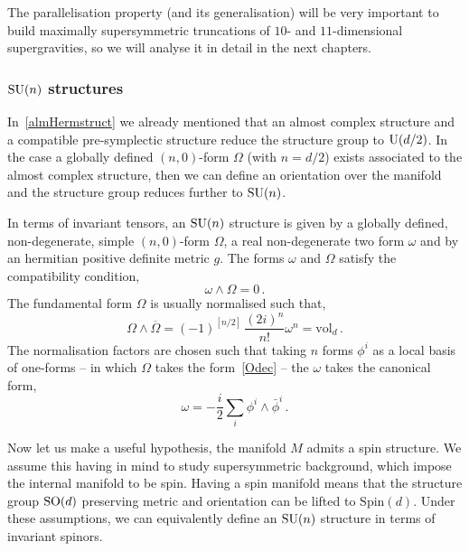 \documentclass[debug]{phd}
\begin{document}
						The parallelisation property (and its generalisation) will be very important to build maximally supersymmetric truncations of $10$- and $11$-dimensional supergravities, so we will analyse it in detail in the next chapters.
					\subsubsection{\texorpdfstring{$\mathrm{SU}(n)$ structures}{SU(n) structures}}
						In~\cref{almHermstruct} we already mentioned that an almost complex structure and a compatible pre-symplectic structure reduce the structure group to $\mathrm{U}(d/2)$.
						In the case a globally defined $(n,0)$-form $\Omega$ (with $n = d/2$) exists associated to the almost complex structure, then we can define an orientation over the manifold and the structure group reduces further to $\mathrm{SU}(n)$.
						
						In terms of invariant tensors, an $\mathrm{SU}(n)$ structure is given by a globally defined, non-degenerate, simple $(n,0)$-form $\Omega$, a real non-degenerate two form $\omega$ and by an hermitian positive definite metric $g$.
						The forms $\omega$ and $\Omega$ satisfy the compatibility condition,
								\begin{equation}\label{compatib1}
									\omega \wedge \Omega = 0\, .
								\end{equation}
						The fundamental form $\Omega$ is usually normalised such that,
								\begin{equation}\label{compatib2}
									\Omega \wedge \overline{\Omega} = (-1)^{[n/2]}\, \frac{(2i)^{n}}{n!} \omega^n = \mathrm{vol}_{d}\, .
								\end{equation}
						The normalisation factors are chosen such that taking $n$ forms $\phi^i$ as a local basis of one-forms -- in which $\Omega$ takes the form~\eqref{Odec} -- the $\omega$ takes the canonical form,
								\begin{equation}
									\omega = - \frac{i}{2} \sum_{i} \phi^i \wedge \bar{\phi}^i\, .
								\end{equation}
						
						Now let us make a useful hypothesis, the manifold $M$ admits a spin structure. 
						We assume this having in mind to study supersymmetric background, which impose the internal manifold to be spin.
						Having a spin manifold means that the structure group $\mathrm{SO}(d)$ preserving metric and orientation can be lifted to $\mathrm{Spin}(d)$.
						Under these assumptions, we can equivalently define an $\mathrm{SU}(n)$ structure in terms of invariant spinors.
						
\end{document}
